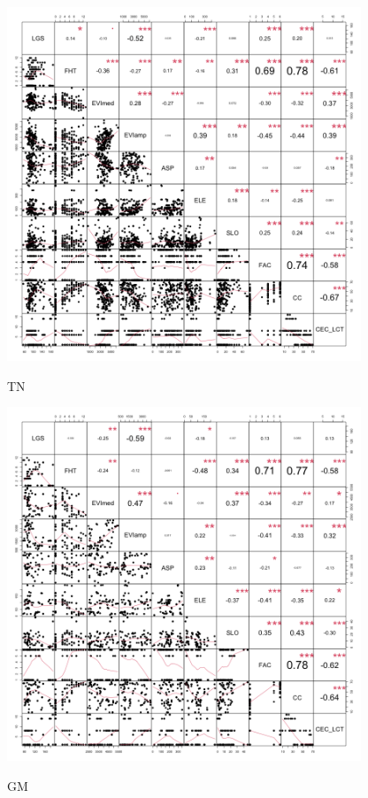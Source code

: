 \documentclass[
  letterpaper,
  DIV=11,
  numbers=noendperiod]{scrartcl}
\begin{document}
\includegraphics[width=4.16667in,height=\textheight]{correlation plots/chart_subplot_both.png}

TN

\includegraphics[width=4.16667in,height=\textheight]{correlation plots/chart_subplot_TN.png}

GM
\end{document}

